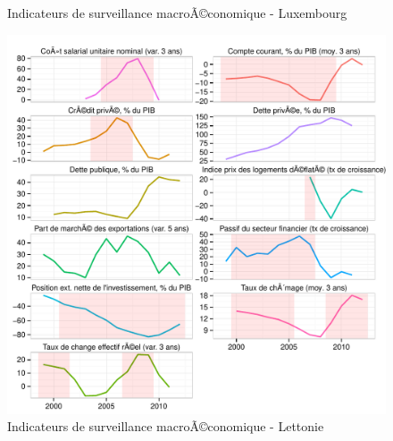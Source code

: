 \documentclass{article}\usepackage[]{graphicx}\usepackage[]{color}
\makeatletter
\def\maxwidth{ %
  \ifdim\Gin@nat@width>\linewidth
    \linewidth
  \else
    \Gin@nat@width
  \fi
}
\newenvironment{knitrout}{}{} %
\makeatother
\begin{document}
\begin{knitrout}
\begin{figure}[p]
{}

\caption[Indicateurs de surveillance macroÃ©conomique - Luxembourg]{Indicateurs de surveillance macroÃ©conomique - Luxembourg\label{fig:byco18}}
\end{figure}

\begin{figure}[p]


{\centering \includegraphics[width=\maxwidth]{figure_graph/byco19} 

}

\caption[Indicateurs de surveillance macroÃ©conomique - Lettonie]{Indicateurs de surveillance macroÃ©conomique - Lettonie\label{fig:byco19}}
\end{figure}

\begin{figure}[p]



\end{figure}
\end{knitrout}
\end{document}
